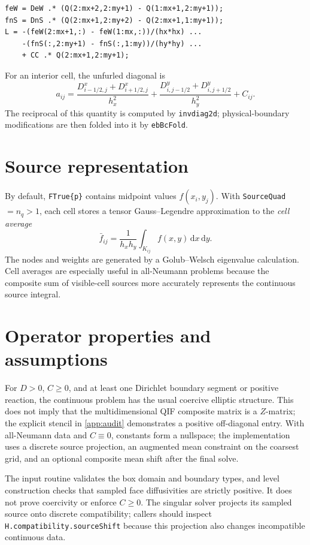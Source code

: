 \documentclass[11pt,oneside,openany]{book}
\newcommand{\code}[1]{\textnormal{\texttt{#1}}}
\newcommand{\dd}{\,\mathrm{d}}
\begin{document}
\begin{lstlisting}[caption={Core operator in \code{ebKernels}.},label={lst:operator}]
feW = DeW .* (Q(2:mx+2,2:my+1) - Q(1:mx+1,2:my+1));
fnS = DnS .* (Q(2:mx+1,2:my+2) - Q(2:mx+1,1:my+1));
L = -(feW(2:mx+1,:) - feW(1:mx,:))/(hx*hx) ...
    -(fnS(:,2:my+1) - fnS(:,1:my))/(hy*hy) ...
    + CC .* Q(2:mx+1,2:my+1);
\end{lstlisting}

For an interior cell, the unfurled diagonal is
\begin{equation}
  a_{ij}=
  \frac{D^x_{i-1/2,j}+D^x_{i+1/2,j}}{h_x^2}
  +\frac{D^y_{i,j-1/2}+D^y_{i,j+1/2}}{h_y^2}
  +C_{ij}.
  \label{eq:diag}
\end{equation}
The reciprocal of this quantity is computed by \code{invdiag2d}; physical-boundary modifications are then folded into it by \code{ebBcFold}.

\section{Source representation}
By default, \code{FTrue\{p\}} contains midpoint values $f(x_i,y_j)$. With \code{SourceQuad}$=n_q>1$, each cell stores a tensor Gauss--Legendre approximation to the \emph{cell average}
\[
  \bar f_{ij}=\frac{1}{h_xh_y}\int_{K_{ij}}f(x,y)\dd x\dd y.
\]
The nodes and weights are generated by a Golub--Welsch eigenvalue calculation. Cell averages are especially useful in all-Neumann problems because the composite sum of visible-cell sources more accurately represents the continuous source integral.

\section{Operator properties and assumptions}
For $D>0$, $C\ge 0$, and at least one Dirichlet boundary segment or positive reaction, the continuous problem has the usual coercive elliptic structure. This does not imply that the multidimensional QIF composite matrix is a $Z$-matrix; the explicit stencil in \cref{app:audit} demonstrates a positive off-diagonal entry. With all-Neumann data and $C\equiv0$, constants form a nullspace; the implementation uses a discrete source projection, an augmented mean constraint on the coarsest grid, and an optional composite mean shift after the final solve.

\begin{cautionbox}
The input routine validates the box domain and boundary types, and level construction checks that sampled face diffusivities are strictly positive. It does not prove coercivity or enforce $C\ge0$. The singular solver projects its sampled source onto discrete compatibility; callers should inspect \code{H.compatibility.sourceShift} because this projection also changes incompatible continuous data.
\end{cautionbox}
\end{document}
